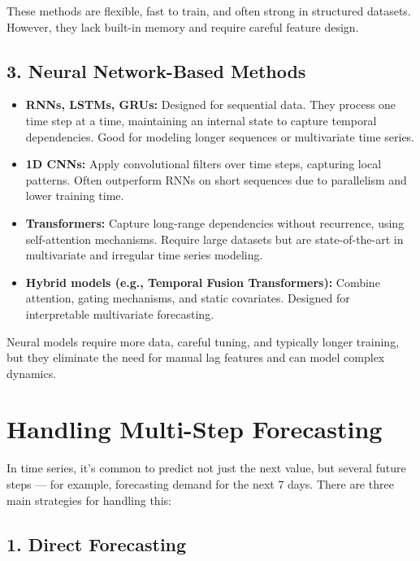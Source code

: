 \documentclass[12pt,openany]{book}
\begin{document}
These methods are flexible, fast to train, and often strong in structured datasets. However, they lack built-in memory and require careful feature design.

\subsection*{3. Neural Network-Based Methods}

\begin{itemize}
    \item \textbf{RNNs, LSTMs, GRUs:} Designed for sequential data. They process one time step at a time, maintaining an internal state to capture temporal dependencies. Good for modeling longer sequences or multivariate time series.

    \item \textbf{1D CNNs:} Apply convolutional filters over time steps, capturing local patterns. Often outperform RNNs on short sequences due to parallelism and lower training time.

    \item \textbf{Transformers:} Capture long-range dependencies without recurrence, using self-attention mechanisms. Require large datasets but are state-of-the-art in multivariate and irregular time series modeling.

    \item \textbf{Hybrid models (e.g., Temporal Fusion Transformers):} Combine attention, gating mechanisms, and static covariates. Designed for interpretable multivariate forecasting.
\end{itemize}

Neural models require more data, careful tuning, and typically longer training, but they eliminate the need for manual lag features and can model complex dynamics.


\section{Handling Multi-Step Forecasting}

In time series, it’s common to predict not just the next value, but several future steps — for example, forecasting demand for the next 7 days. There are three main strategies for handling this:

\subsection*{1. Direct Forecasting}
\end{document}
